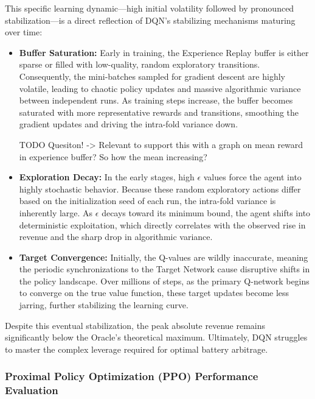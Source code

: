             This specific learning dynamic—high initial volatility followed by pronounced stabilization—is a direct reflection of DQN's stabilizing mechanisms maturing over time:
            \begin{itemize}
                \item \textbf{Buffer Saturation:} Early in training, the Experience Replay buffer is either sparse or filled with low-quality, random exploratory transitions. Consequently, the mini-batches sampled for gradient descent are highly volatile, leading to chaotic policy updates and massive algorithmic variance between independent runs. As training steps increase, the buffer becomes saturated with more representative rewards and transitions, smoothing the gradient updates and driving the intra-fold variance down.
                
                TODO Quesiton! -> Relevant to support this with a graph on mean reward in experience buffer? So how the mean increasing?  
                
                \item \textbf{Exploration Decay:} In the early stages, high $\epsilon$ values force the agent into highly stochastic behavior. Because these random exploratory actions differ based on the initialization seed of each run, the intra-fold variance is inherently large. As $\epsilon$ decays toward its minimum bound, the agent shifts into deterministic exploitation, which directly correlates with the observed rise in revenue and the sharp drop in algorithmic variance.
                \item \textbf{Target Convergence:} Initially, the Q-values are wildly inaccurate, meaning the periodic synchronizations to the Target Network cause disruptive shifts in the policy landscape. Over millions of steps, as the primary Q-network begins to converge on the true value function, these target updates become less jarring, further stabilizing the learning curve.
            \end{itemize}
            
            Despite this eventual stabilization, the peak absolute revenue remains significantly below the Oracle's theoretical maximum. Ultimately, DQN struggles to master the complex leverage required for optimal battery arbitrage.
             \subsubsection{Proximal Policy Optimization (PPO) Performance Evaluation}

